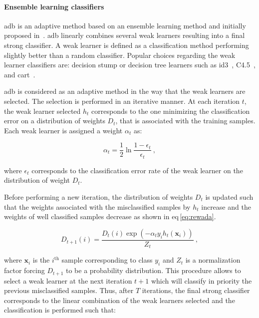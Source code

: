 \paragraph{Ensemble learning classifiers}
\Ac{adb} is an adaptive method based on an ensemble learning method and initially proposed in~\cite{Freund1997}. 
\Ac{adb} linearly combines several weak learners resulting into a final strong classifier.
A weak learner is defined as a classification method performing slightly better than a random classifier.
Popular choices regarding the weak learner classifiers are: decision stump or decision tree learners such as \ac{id3}~\cite{Quinlan1986}, C4.5~\cite{Quinlan1993}, and \ac{cart}~\cite{Breiman1984}.

\Ac{adb} is considered as an adaptive method in the way that the weak learners are selected.
The selection is performed in an iterative manner.
At each iteration $t$, the weak learner selected $h_t$ corresponds to the one minimizing the classification error on a distribution of weights $D_t$, that is associated with the training samples.
Each weak learner is assigned a weight $\alpha_t$ as:

\begin{equation}
	\alpha_t = \frac{1}{2} \ln \frac{1 - \epsilon_t}{\epsilon_t} \ ,
	\label{eq:wclssada}
\end{equation}

\noindent where $\epsilon_t$ corresponds to the classification error rate of the weak learner on the distribution of weight $D_t$.

Before performing a new iteration, the distribution of weights $D_t$ is updated such that the weights associated with the misclassified samples by $h_t$ increase and the weights of well classified samples decrease as shown in \acs{eq}\,\eqref{eq:rewada}.

\begin{equation}
	D_{t+1}(i) = \frac{ D_t(i) \exp \left( -\alpha_t y_i h_{t}(\mathbf{x}_{i} ) \right) }{ Z_t  } \ ,
	\label{eq:rewada} 
\end{equation}

\noindent where $\mathbf{x}_i$ is the $i^{\text{th}}$ sample corresponding to class $y_i$ and $Z_t$ is a normalization factor forcing $D_{t+1}$ to be a probability distribution. 
This procedure allows to select a weak learner at the next iteration $t+1$ which will classify in priority the previous misclassified samples. 
Thus, after $T$ iterations, the final strong classifier corresponds to the linear combination of the weak learners selected and the classification is performed such that:

